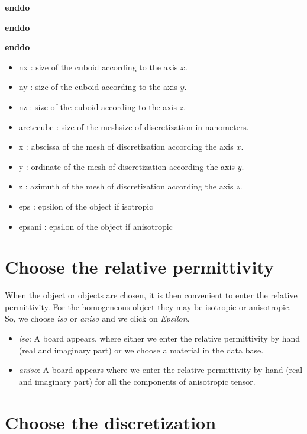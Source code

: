     \hspace{15mm} {\bf enddo}

  \hspace{10mm} {\bf enddo}

 \hspace{5mm} {\bf enddo}


\vspace{10mm}

\begin{itemize}
\item nx : size of the cuboid according to the axis $x$.
\item ny : size of the cuboid according to the axis $y$.
\item nz : size of the cuboid according to the axis $z$.
\item aretecube : size of the meshsize of discretization in nanometers. 
\item x : abscissa of the mesh of discretization according the axis
  $x$.
\item y : ordinate of the mesh of discretization according the axis
  $y$.
\item z : azimuth of the mesh of discretization according the axis
  $z$.
\item eps : epsilon of the object if isotropic
\item epsani : epsilon of the object if anisotropic
\end{itemize}

\section{Choose the relative permittivity}

When the object or objects are chosen, it is then convenient to enter
the relative permittivity. For the homogeneous object they may be
isotropic or anisotropic. So, we choose {\it iso} or {\it aniso} and
we click on {\it Epsilon}.

\begin{itemize} 
\item {\it iso}: A board appears, where either we enter the relative
  permittivity by hand (real and imaginary part) or we choose a
  material in the data base.
\item {\it aniso}: A board appears where we enter the relative
  permittivity by hand (real and imaginary part) for all the
  components of anisotropic tensor.
\end{itemize}

\section{Choose the discretization}


